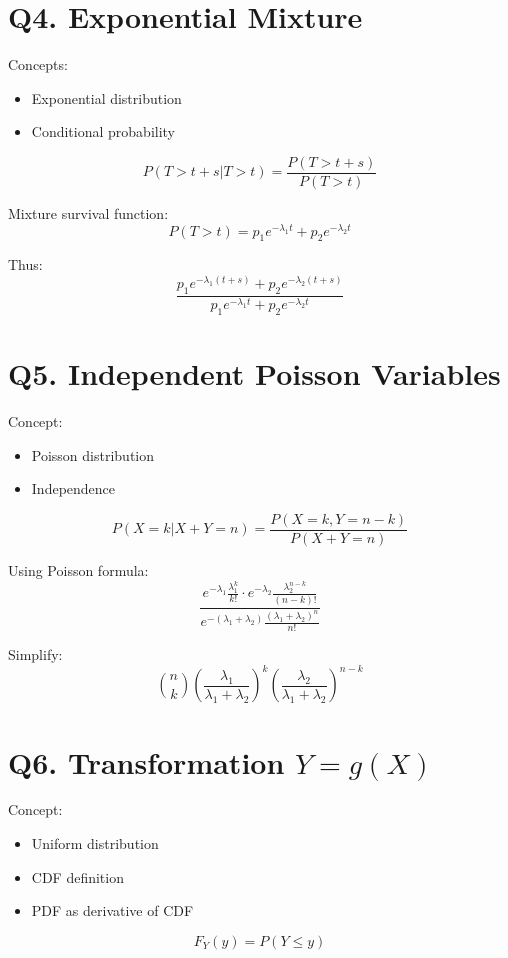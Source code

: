 \documentclass[11pt]{article}
\begin{document}
\section*{Q4. Exponential Mixture}

Concepts:
\begin{itemize}
\item Exponential distribution
\item Conditional probability
\end{itemize}

\[
P(T>t+s|T>t)
=
\frac{P(T>t+s)}{P(T>t)}
\]

Mixture survival function:
\[
P(T>t)
=
p_1 e^{-\lambda_1 t}
+
p_2 e^{-\lambda_2 t}
\]

Thus:
\[
\frac{
p_1 e^{-\lambda_1 (t+s)}
+
p_2 e^{-\lambda_2 (t+s)}
}{
p_1 e^{-\lambda_1 t}
+
p_2 e^{-\lambda_2 t}
}
\]

\section*{Q5. Independent Poisson Variables}

Concept:
\begin{itemize}
\item Poisson distribution
\item Independence
\end{itemize}

\[
P(X=k|X+Y=n)
=
\frac{P(X=k, Y=n-k)}{P(X+Y=n)}
\]

Using Poisson formula:
\[
\frac{
e^{-\lambda_1}\frac{\lambda_1^k}{k!}
\cdot
e^{-\lambda_2}\frac{\lambda_2^{n-k}}{(n-k)!}
}{
e^{-(\lambda_1+\lambda_2)}\frac{(\lambda_1+\lambda_2)^n}{n!}
}
\]

Simplify:
\[
\binom{n}{k}
\left(
\frac{\lambda_1}{\lambda_1+\lambda_2}
\right)^k
\left(
\frac{\lambda_2}{\lambda_1+\lambda_2}
\right)^{n-k}
\]

\section*{Q6. Transformation $Y=g(X)$}

Concept:
\begin{itemize}
\item Uniform distribution
\item CDF definition
\item PDF as derivative of CDF
\end{itemize}

\[
F_Y(y)=P(Y\le y)
\]
\end{document}
